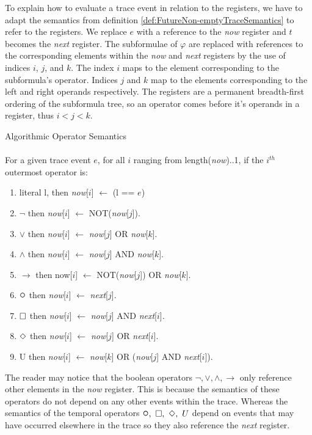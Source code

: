 To explain how to evaluate a trace event in relation to the registers, we have to adapt the semantics from definition \ref{def:FutureNon-emptyTraceSemantics} to refer to the registers.  We replace $e$ with a reference to the \textit{now} register and $t$ becomes the \textit{next} register.  The subformulae of $ \varphi $ are replaced with references to the corresponding elements within the \textit{now} and \textit{next} registers by the use of indices $i$, $j$, and $k$.  The index $i$ maps to the element corresponding to the subformula's operator.  Indices $j$ and $k$ map to the elements corresponding to the left and right operands respectively.  The registers are a permanent breadth-first ordering of the subformula tree, so an operator comes before it's operands in a register, thus $i < j < k$.\\
\newpage
\begin{definition}Algorithmic Operator Semantics\\
\label{def:AlgorithmicOperatorSemantics}
\\
For a given trace event $e$, for all $i$ ranging from length(\textit{now})..1, if the $i^{th}$ outermost operator is:
\begin{enumerate}
\item literal l, then \textit{now}[$i$] $ \leftarrow $ (l == $e$)
\item $ \neg $ then \textit{now}[$i$] $ \leftarrow $ NOT(\textit{now}[$j$]).
\item $ \lor $ then \textit{now}[$i$] $ \leftarrow $ \textit{now}[$j$] OR \textit{now}[$k$]. 
\item $ \land $ then \textit{now}[$i$] $ \leftarrow $ \textit{now}[$j$] AND \textit{now}[$k$]. 
\item $ \rightarrow $ then now[$i$] $ \leftarrow $ NOT(\textit{now}[$j$]) OR \textit{now}[$k$]. 
\item $ \LTLnext $ then \textit{now}[$i$] $ \leftarrow $ \textit{next}[$j$].
\item $ \square $ then \textit{now}[$i$] $ \leftarrow $ \textit{now}[$j$] AND \textit{next}[$i$].
\item $ \Diamond $ then \textit{now}[$i$] $ \leftarrow $ \textit{now}[$j$] OR \textit{next}[$i$].
\item U then \textit{now}[$i$] $ \leftarrow $ \textit{now}[$k$] OR (\textit{now}[$j$] AND \textit{next}[$i$]).
\end{enumerate}
\end{definition}

The reader may notice that the boolean operators $ \neg, \lor, \land, \rightarrow $ only reference other elements in the \textit{now} register.  This is because the semantics of these operators do not depend on any other events within the trace.  Whereas the semantics of the temporal operators $ \LTLnext, \ \LTLalways,  \ \LTLeventually, \ U $ depend on events that may have occurred elsewhere in the trace so they also reference the \textit{next} register.

